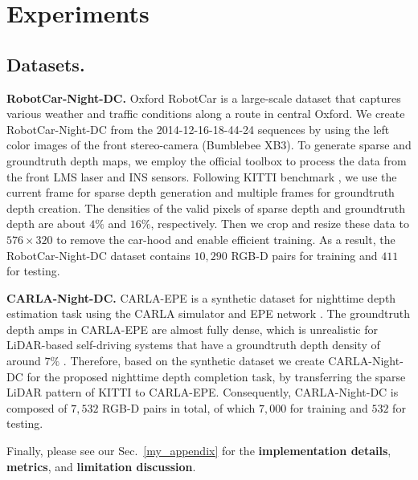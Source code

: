 \documentclass{article}
\begin{document}
\section{Experiments}

\subsection{Datasets.} 

\textbf{RobotCar-Night-DC.} Oxford RobotCar \cite{maddern20171} is a large-scale dataset that captures various weather and traffic conditions along a route in central Oxford. We create RobotCar-Night-DC from the 2014-12-16-18-44-24 sequences by using the left color images of the front stereo-camera (Bumblebee XB3). To generate sparse and groundtruth depth maps, we employ the official toolbox to process the data from the front LMS laser and INS sensors. Following KITTI benchmark \cite{Uhrig2017THREEDV}, we use the current frame for sparse depth generation and multiple frames for groundtruth depth creation. The densities of the valid pixels of sparse depth and groundtruth depth are about $4\%$ and $16\%$, respectively. Then we crop and resize these data to $576\times 320$ to remove the car-hood and enable efficient training. As a result, the RobotCar-Night-DC dataset contains $10,290$ RGB-D pairs for training and $411$ for testing. 

\textbf{CARLA-Night-DC.} CARLA-EPE \cite{zheng2023steps} is a synthetic dataset for nighttime depth estimation task using the CARLA simulator \cite{dosovitskiy2017carla} and EPE network \cite{richter2022enhancing}. The groundtruth depth amps in CARLA-EPE are almost fully dense, which is unrealistic for LiDAR-based self-driving systems that have a groundtruth depth density of around $7\%$ \cite{yan2022rignet}. Therefore, based on the synthetic dataset we create CARLA-Night-DC for the proposed nighttime depth completion task, by transferring the sparse LiDAR pattern of KITTI \cite{Uhrig2017THREEDV} to CARLA-EPE. Consequently, CARLA-Night-DC is composed of $7,532$ RGB-D pairs in total, of which $7,000$ for training and $532$ for testing. 

Finally, please see our Sec.~\ref{my_appendix} for the \textbf{implementation details}, \textbf{metrics}, and \textbf{limitation discussion}. 
\end{document}
